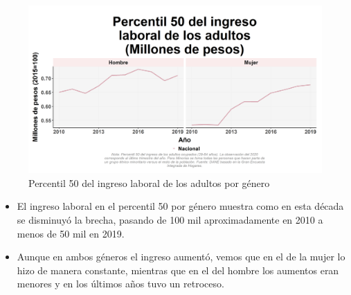     \begin{figure}[H]
        \caption{Percentil 50 del ingreso laboral de los adultos por género \label{map_result_2} }
        \begin{center}
        \includegraphics[width=\textwidth,keepaspectratio]{img/var_19_trend.png}
        \end{center}
    \end{figure}
            \begin{itemize}
                \item El ingreso laboral en el percentil 50 por género muestra como en esta década se disminuyó la brecha, pasando de 100 mil aproximadamente en 2010 a menos de 50 mil en 2019.
                \item Aunque en ambos géneros el ingreso aumentó, vemos que en el de la mujer lo hizo de manera constante, mientras que en el del hombre los aumentos eran menores y en los últimos años tuvo un retroceso.
                \end{itemize}

